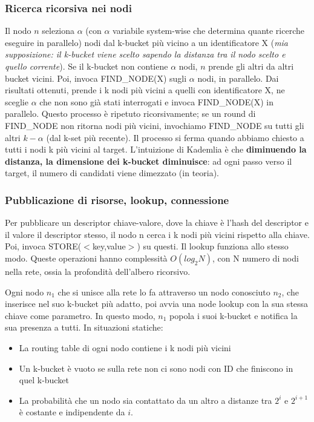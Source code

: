 \documentclass[11pt]{article}
\begin{document}
\subsubsection{Ricerca ricorsiva nei nodi} Il nodo $n$ seleziona $\alpha$ (con $\alpha$ variabile system-wise che determina quante ricerche eseguire in parallelo) nodi dal k-bucket più vicino a un identificatore X (\textit{mia supposizione: il k-bucket viene scelto sapendo la distanza tra il nodo scelto e quello corrente}). Se il k-bucket non contiene $\alpha$ nodi, $n$ prende gli altri da altri bucket vicini. Poi, invoca FIND\_NODE(X) sugli $\alpha$ nodi, in parallelo. Dai risultati ottenuti, prende i k nodi più vicini a quelli con identificatore X, ne sceglie $\alpha$ che non sono già stati interrogati e invoca FIND\_NODE(X) in parallelo. Questo processo è ripetuto ricorsivamente; se un round di FIND\_NODE non ritorna nodi più vicini, invochiamo FIND\_NODE su tutti gli altri $k-\alpha$ (dal k-set più recente). Il processo si ferma quando abbiamo chiesto a tutti i nodi k più vicini al target. 
L'intuizione di Kademlia è che \textbf{diminuendo la distanza, la dimensione dei k-bucket diminuisce}: ad ogni passo verso il target, il numero di candidati viene dimezzato (in teoria). 
\subsubsection{Pubblicazione di risorse, lookup, connessione}
Per pubblicare un descriptor chiave-valore, dove la chiave è l'hash del descriptor e il valore il descriptor stesso, il nodo n cerca i k nodi più vicini rispetto alla chiave. Poi, invoca STORE($<$key,value$>$) su questi. Il lookup funziona allo stesso modo. Queste operazioni hanno complessità $O(log_2 N)$, con N numero di nodi nella rete, ossia la profondità dell'albero ricorsivo.

Ogni nodo $n_1$ che si unisce alla rete lo fa attraverso un nodo conosciuto $n_2$, che inserisce nel suo k-bucket più adatto, poi avvia una node lookup con la sua stessa chiave come parametro. In questo modo, $n_1$ popola i suoi k-bucket e notifica la sua presenza a tutti. In situazioni statiche:
\begin{itemize}
    \item La routing table di ogni nodo contiene i k nodi più vicini
    \item Un k-bucket è vuoto se sulla rete non ci sono nodi con ID che finiscono in quel k-bucket
    \item La probabilità che un nodo sia contattato da un altro a distanze tra $2^i$ e $2^{i+1}$ è costante e indipendente da $i$.
\end{itemize} 
\end{document}
